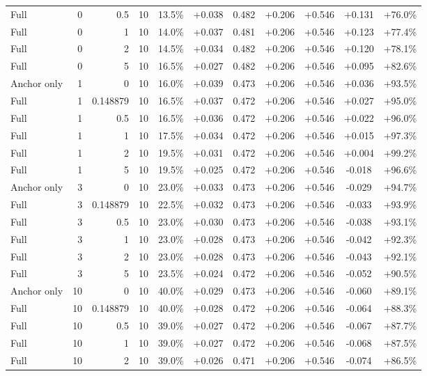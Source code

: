 \begin{table}[htbp]
\begin{tabular}{lrrrccccccc}
Full & 0 & 0.5 & 10 & 13.5\% & +0.038 & 0.482 & +0.206 & +0.546 & +0.131 & +76.0\% \\
Full & 0 & 1 & 10 & 14.0\% & +0.037 & 0.481 & +0.206 & +0.546 & +0.123 & +77.4\% \\
Full & 0 & 2 & 10 & 14.5\% & +0.034 & 0.482 & +0.206 & +0.546 & +0.120 & +78.1\% \\
Full & 0 & 5 & 10 & 16.5\% & +0.027 & 0.482 & +0.206 & +0.546 & +0.095 & +82.6\% \\
Anchor only & 1 & 0 & 10 & 16.0\% & +0.039 & 0.473 & +0.206 & +0.546 & +0.036 & +93.5\% \\
Full & 1 & 0.148879 & 10 & 16.5\% & +0.037 & 0.472 & +0.206 & +0.546 & +0.027 & +95.0\% \\
Full & 1 & 0.5 & 10 & 16.5\% & +0.036 & 0.472 & +0.206 & +0.546 & +0.022 & +96.0\% \\
Full & 1 & 1 & 10 & 17.5\% & +0.034 & 0.472 & +0.206 & +0.546 & +0.015 & +97.3\% \\
Full & 1 & 2 & 10 & 19.5\% & +0.031 & 0.472 & +0.206 & +0.546 & +0.004 & +99.2\% \\
Full & 1 & 5 & 10 & 19.5\% & +0.025 & 0.472 & +0.206 & +0.546 & -0.018 & +96.6\% \\
Anchor only & 3 & 0 & 10 & 23.0\% & +0.033 & 0.473 & +0.206 & +0.546 & -0.029 & +94.7\% \\
Full & 3 & 0.148879 & 10 & 22.5\% & +0.032 & 0.473 & +0.206 & +0.546 & -0.033 & +93.9\% \\
Full & 3 & 0.5 & 10 & 23.0\% & +0.030 & 0.473 & +0.206 & +0.546 & -0.038 & +93.1\% \\
Full & 3 & 1 & 10 & 23.0\% & +0.028 & 0.473 & +0.206 & +0.546 & -0.042 & +92.3\% \\
Full & 3 & 2 & 10 & 23.0\% & +0.028 & 0.473 & +0.206 & +0.546 & -0.043 & +92.1\% \\
Full & 3 & 5 & 10 & 23.5\% & +0.024 & 0.472 & +0.206 & +0.546 & -0.052 & +90.5\% \\
Anchor only & 10 & 0 & 10 & 40.0\% & +0.029 & 0.473 & +0.206 & +0.546 & -0.060 & +89.1\% \\
Full & 10 & 0.148879 & 10 & 40.0\% & +0.028 & 0.472 & +0.206 & +0.546 & -0.064 & +88.3\% \\
Full & 10 & 0.5 & 10 & 39.0\% & +0.027 & 0.472 & +0.206 & +0.546 & -0.067 & +87.7\% \\
Full & 10 & 1 & 10 & 39.0\% & +0.027 & 0.472 & +0.206 & +0.546 & -0.068 & +87.5\% \\
Full & 10 & 2 & 10 & 39.0\% & +0.026 & 0.471 & +0.206 & +0.546 & -0.074 & +86.5\% \\

\end{tabular}
\end{table}
